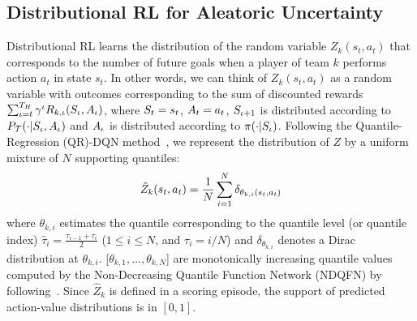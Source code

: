 \documentclass{article}
\newcommand{\horizon}{T_{H}}
\newcommand{\state}{s}
\newcommand{\action}{a}
\newcommand{\transition}{t}
\newcommand{\reward}{r}
\newcommand{\agentIndex}{k}
\newcommand{\quantielIndex}{i}
\begin{document}
\subsection{Distributional RL for Aleatoric Uncertainty}\label{subsec:aleatoric-uncertainty}
Distributional RL learns the distribution of the random variable $Z_{\agentIndex}(\state_{t},\action_{t})$ that 
corresponds to the number of future goals when a player of team $k$ performs action $\action_{t}$ in state $\state_{t}$.  In other words, we can think of $Z_{\agentIndex}(\state_{t},\action_{t})$ as a random variable with outcomes corresponding to the sum of discounted rewards $\sum_{\iota=t}^{\horizon}\gamma^{\iota}\MakeUppercase{R}_{\agentIndex,\iota}(\MakeUppercase{\state}_\iota,\MakeUppercase{\action}_\iota)$, where $\MakeUppercase{\state}_t=\state_{t}$, $\MakeUppercase{\action}_t=\action_{t}$,
$\MakeUppercase{\state}_{\iota+1}$ is distributed according to $P_{\mathcal{\MakeUppercase{\transition}}}(\cdot|\MakeUppercase{\state}_\iota,\MakeUppercase{\action}_\iota)$ and $\MakeUppercase{\action}_\iota$ is distributed according to $\pi(\cdot|\MakeUppercase{\state}_\iota)$. 
Following the Quantile-Regression (QR)-DQN method~\cite{bellemare2017distributional}, we represent the distribution of $Z$ by a uniform mixture of $N$ supporting quantiles:
\vspace{-0.15in}
\begin{equation}
    \hat{Z}_{\agentIndex}(\state_{t},\action_{t}) = \frac{1}{N}\sum_{\quantielIndex=1}^N \delta_{\theta_{\agentIndex,\quantielIndex}(\state_{t},\action_{t})}
    \vspace{-0.05in}
\end{equation}
where $\theta_{\agentIndex,\quantielIndex}$ estimates the quantile corresponding to the quantile level (or quantile index) $\hat{\tau}_i=\frac{\tau_{\quantielIndex-1}+\tau_\quantielIndex}{2}$ ($1\leq \quantielIndex\leq N$, and $\tau_\quantielIndex=\quantielIndex/N$) and  $\delta_{\theta_{\agentIndex,i}}$ denotes a Dirac distribution at $\theta_{\agentIndex,\quantielIndex}$. [$\theta_{\agentIndex,1},\dots,\theta_{\agentIndex,N}$] are monotonically increasing quantile values computed by the Non-Decreasing Quantile Function Network (NDQFN) by following~\cite{Zhou2021Quantile}. Since $\hat{Z}_{\agentIndex}$ is defined in a scoring episode, the support of predicted action-value distributions is in $[0,1]$.
\end{document}
